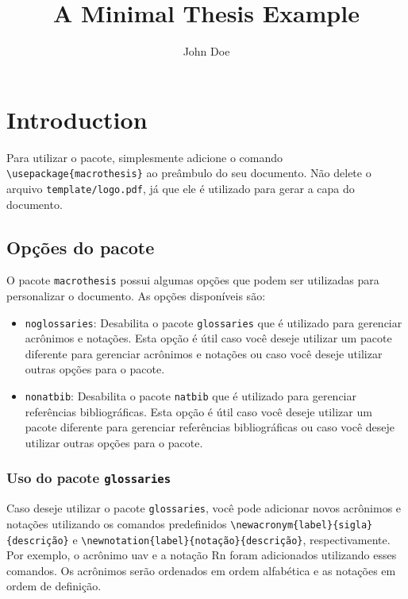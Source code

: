 \documentclass{macrothesis}
\title{A Minimal Thesis Example}
\author{John Doe}
\begin{document}
\maketitlepage
\preamblepage

\chapter{Introduction}
Para utilizar o pacote, simplesmente adicione o comando \texttt{\textbackslash usepackage\{macrothesis\}} ao preâmbulo do seu documento. Não delete o arquivo \texttt{template/logo.pdf}, já que ele é utilizado para gerar a capa do documento. 
\section{Opções do pacote}
O pacote \texttt{macrothesis} possui algumas opções que podem ser utilizadas para personalizar o documento. As opções disponíveis são:
\begin{itemize}
    \item \texttt{noglossaries}: Desabilita o pacote \texttt{glossaries} que é utilizado para gerenciar acrônimos e notações. Esta opção é útil caso você deseje utilizar um pacote diferente para gerenciar acrônimos e notações ou caso você deseje utilizar outras opções para o pacote.
    \item \texttt{nonatbib}: Desabilita o pacote \texttt{natbib} que é utilizado para gerenciar referências bibliográficas. Esta opção é útil caso você deseje utilizar um pacote diferente para gerenciar referências bibliográficas ou caso você deseje utilizar outras opções para o pacote.
\end{itemize}

\subsection{Uso do pacote \texttt{glossaries}}
Caso deseje utilizar o pacote \texttt{glossaries}, você pode adicionar novos acrônimos e notações utilizando os comandos predefinidos \texttt{\textbackslash newacronym\{label\}\{sigla\}\{descrição\}} e \texttt{\textbackslash newnotation\{label\}\{notação\}\{descrição\}}, respectivamente. Por exemplo, o acrônimo \gls{uav} e a notação \gls{Rn} foram adicionados utilizando esses comandos. Os acrônimos serão ordenados em ordem alfabética e as notações em ordem de definição.
\end{document}
